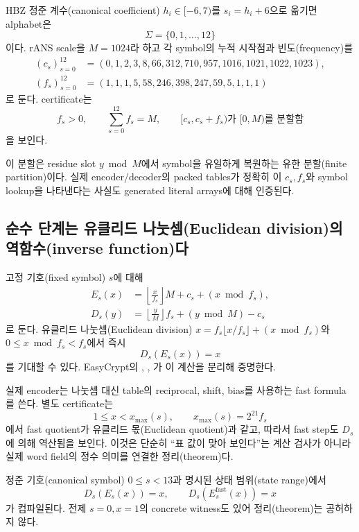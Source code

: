 HBZ 정준 계수(canonical coefficient) \(h_i\in[-6,7)\)를
\(s_i=h_i+6\)으로 옮기면 alphabet은
\[
  \Sigma=\{0,1,\ldots,12\}
\]
이다. rANS scale을 \(M=1024\)라 하고 각 symbol의 누적 시작점과
빈도(frequency)를
\[
\begin{aligned}
(c_s)_{s=0}^{12}
  &=(0,1,2,3,8,66,312,710,957,1016,1021,1022,1023),\\
(f_s)_{s=0}^{12}
  &=(1,1,1,5,58,246,398,247,59,5,1,1,1)
\end{aligned}
\]
로 둔다. certificate는
\[
  f_s>0,\qquad \sum_{s=0}^{12}f_s=M,\qquad
  [c_s,c_s+f_s)\text{가 }[0,M)\text{를 분할함}
\]
을 보인다.

이 분할은 residue slot \(y\bmod M\)에서 symbol을 유일하게 복원하는
유한 분할(finite partition)이다. 실제 encoder/decoder의 packed tables가 정확히
이 \(c_s,f_s\)와
symbol lookup을 나타낸다는 사실도 generated literal arrays에 대해 인증된다.

\subsection{순수 단계는 유클리드 나눗셈(Euclidean division)의
역함수(inverse function)다}

고정 기호(fixed symbol) \(s\)에 대해
\begin{align*}
  E_s(x)
    &=\left\lfloor\frac{x}{f_s}\right\rfloor M
      +c_s+(x\bmod f_s),\\
  D_s(y)
    &=\left\lfloor\frac{y}{M}\right\rfloor f_s
      +(y\bmod M)-c_s
\end{align*}
로 둔다. 유클리드 나눗셈(Euclidean division)
\(x=f_s\lfloor x/f_s\rfloor+(x\bmod f_s)\)와
\(0\le x\bmod f_s<f_s\)에서 즉시
\[
  D_s(E_s(x))=x
\]
를 기대할 수 있다. EasyCrypt의
,
,
가 이 계산을 분리해 증명한다.

실제 encoder는 나눗셈 대신 table의 reciprocal, shift, bias를 사용하는 fast
formula를 쓴다. 별도 certificate는
\[
  1\le x<x_{\max}(s),\qquad
  x_{\max}(s)=2^{21}f_s
\]
에서 fast quotient가 유클리드 몫(Euclidean quotient)과 같고, 따라서 fast step도
\(D_s\)에 의해 역산됨을 보인다. 이것은 단순히 ``표 값이 맞아 보인다''는
계산 검사가 아니라 실제 word field의 정수 의미를 연결한 정리(theorem)다.

\begin{verified}
정준 기호(canonical symbol) \(0\le s<13\)과 명시된 상태 범위(state range)에서
\[
  D_s(E_s(x))=x,\qquad
  D_s(E^{\mathrm{fast}}_s(x))=x
\]
가 컴파일된다. 전제 \(s=0,x=1\)의 concrete witness도 있어 정리(theorem)는 공허하지
않다.
\end{verified}

